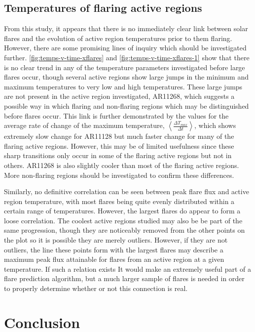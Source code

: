 \documentclass{article}
\begin{document}
\subsection{Temperatures of flaring active regions}
From this study, it appears that there is no immediately clear link
between solar flares and the evolution of active region temperatures
prior to them flaring. However, there are some promising lines of
inquiry which should be investigated further. \ref{fig:temps-v-time-xflares}
and \ref{fig:temps-v-time-xflares-1} show that there is no clear
trend in any of the temperature parameters investigated before large
flares occur, though several active regions show large jumps in the
minimum and maximum temperatures to very low and high temperatures.
These large jumps are not present in the active region investigated,
AR11268, which suggests a possible way in which flaring and non-flaring
regions which may be distinguished before flares occur. This link
is further demonstrated by the values for the average rate of change
of the maximum temperature, $\left\langle \frac{\Delta T_{max}}{\Delta t}\right\rangle $,
which shows extremely slow change for AR11128 but much faster change
for many of the flaring active regions. However, this may be of limited
usefulness since these sharp transitions only occur in some of the
flaring active regions but not in others. AR11268 is also slightly
cooler than most of the flaring active regions. More non-flaring regions
should be investigated to confirm these differences.

Similarly, no definitive correlation can be seen between peak flare
flux and active region temperature, with most flares being quite evenly
distributed within a certain range of temperatures. However, the largest
flares do appear to form a loose correlation. The coolest active regions
studied may also be be part of the same progression, though they are
noticeably removed from the other points on the plot so it is possible
they are merely outliers. However, if they are not outliers, the line
these points form with the largest flares may describe a maximum peak
flux attainable for flares from an active region at a given temperature.
If such a relation exists It would make an extremely useful part of
a flare prediction algorithm, but a much larger sample of flares is
needed in order to properly determine whether or not this connection
is real.


\section{Conclusion}
\end{document}
